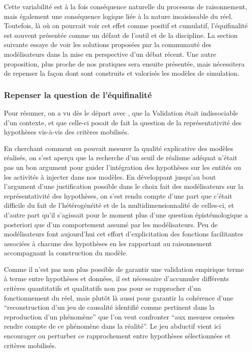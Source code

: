 Cette variabilité est à la fois conséquence naturelle du processus de raisonnement, mais également une conséquence logique liée à la nature insaisissable du réel. Toutefois, là où on pourrait voir cet effet comme positif et cumulatif, l'équifinalité est souvent présentée comme un défaut de l'outil et de la discipline. La section suivante essaye de voir les solutions proposées par la communauté des modélisateurs dans la mise en perspective d'un débat récent. Une autre proposition, plus proche de nos pratiques sera ensuite présentée, mais nécessitera de repenser la façon dont sont construits et valorisés les modèles de simulation. %

\subsubsection{Repenser la question de l'équifinalité}
\label{sssec:equifinalite}

Pour résumer, on a vu dès le départ avec \textcite{Hermann1967}, que la Validation était indissociable d'un contexte, et que celle-ci posait de fait la question de la représentativité des hypothèses vis-à-vis des critères mobilisés.

En cherchant comment on pouvait mesurer la qualité explicative des modèles réalisés, on s'est aperçu que la recherche d'un seuil de réalisme adéquat n'était pas un bon argument pour guider l'intégration des hypothèses sur les entités ou les activités à injecter dans nos modèles. En développant jusqu'au bout l'argument d'une justification possible dans le choix fait des modélisateurs sur la représentativité des hypothèses, on s'est rendu compte d'une part que c'était difficile du fait de l'hétérogénéité et de la multidimensionnalité de celles-ci, et d'autre part qu'il s'agissait pour le moment plus d'une question épistémologique a posteriori que d'un comportement assumé par les modélisateurs. Peu de modélisateurs font aujourd'hui cet effort d'explicitation des fonctions facilitantes associées à chacune des hypothèses en les rapportant au raisonnement accompagnant la construction du modèle.

Comme il n'est pas non plus possible de garantir une validation empirique terme à terme entre hypothèses et données, il est nécessaire d'accumuler différents critères quantitatifs et qualitatifs non pas pour se rapprocher d'un fonctionnement du réel, mais plutôt là aussi pour garantir la cohérence d'une \enquote{reconstruction d'un jeu de causalité identifié comme pertinent dans la reproduction d'un phénomène} que l'on veut confronter \enquote{aux mesures censées rendre compte de ce phénomène dans la réalité}. Le jeu abductif vient ici encourager ou perturber ce rapprochement entre hypothèses sélectionnées et critères mobilisés.

